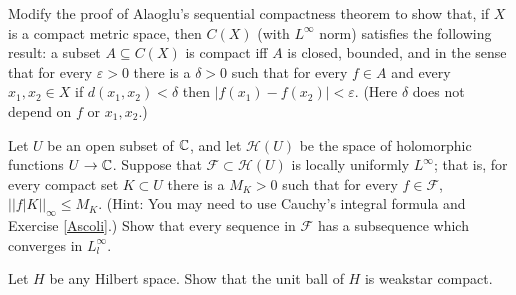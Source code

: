 \begin{exercise}
\label{Ascoli}
Modify the proof of Alaoglu's sequential compactness theorem to show that, if $X$ is a compact metric space, then $C(X)$ (with $L^\infty$ norm) satisfies the following result: a subset $A \subseteq C(X)$ is compact iff $A$ is closed, bounded, and  in the sense that for every $\varepsilon > 0$ there is a $\delta > 0$ such that for every $f \in A$ and every $x_1,x_2 \in X$ if $d(x_1, x_2) < \delta$ then $|f(x_1) - f(x_2)| < \varepsilon$. (Here $\delta$ does not depend on $f$ or $x_1, x_2$.)
\end{exercise}

\begin{exercise}
\label{Montel}
Let $U$ be an open subset of $\mathbb{C}$, and let $\mathcal H(U)$ be the space of holomorphic functions $U \to \mathbb{C}$.
Suppose that $\mathcal F \subset \mathcal H(U)$ is locally uniformly $L^\infty$; that is, for every compact set $K \subset U$ there is a $M_{K} > 0$ such that for every $f \in \mathcal F$, $||f|K||_{\infty} \leq M_K$.
(Hint: You may need to use Cauchy's integral formula and Exercise \ref{Ascoli}.)
Show that every sequence in $\mathcal F$ has a subsequence which converges in $L^\infty_l$.
\end{exercise}

\begin{exercise}
\label{Banach-Alaoglu-Sobolev}
Let $H$ be any Hilbert space. Show that the unit ball of $H$ is weakstar compact.
\end{exercise}

